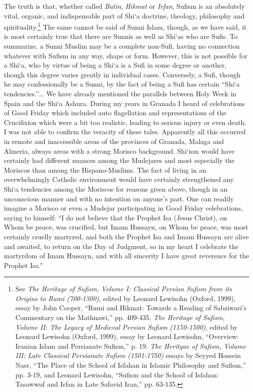 The truth is that, whether called \emph{Batin}, \emph{Hikmat} or \emph{Irfan}, Sufism is an absolutely vital, organic, and indispensable part of Shi`a doctrine, theology, philosophy and spirituality.\footnote{See \emph{The Heritage of Sufism, Volume I: Classical Persian Sufism from its Origins to Rumi (700-1300)}, edited by Leonard Lewisohn (Oxford, 1999), essay by John Cooper, ``Rumi and Hikmat: Towards a Reading of Sabziwari's Commentary on the Mathnawi,'' pp. 409-435. \emph{The Heritage of Sufism, Volume II: The Legacy of Medieval Persian Sufism (1150-1500)}, edited by Leonard Lewisohn (Oxford, 1999), essay by Leonard Lewisohn, ``Overview: Iranian Islam and Persianate Sufism,'' p. 19. \emph{The Heritgae of Sufism, Volume III: Late Classical Persianate Sufism (1501-1750)} essays by Seyyed Hossein Nasr, ``The Place of the School of Isfahan in Islamic Philosophy and Sufism,'' pp. 3-19, and Leonard Lewisohn, ``Sufism and the School of Isfahan: Tasawwuf and Irfan in Late Safavid Iran,'' pp. 63-135.} The same cannot be said of Sunni Islam, though, as we have said, it is most certainly true that there are Sunnis as well as Shi`as who are Sufis. To summarize, a Sunni Muslim may be a complete non-Sufi, having no connection whatever with Sufism in any way, shape or form. However, this is not possible for a Shi`a, who by virtue of being a Shi`a is a Sufi in some degree or another, though this degree varies greatly in individual cases. Conversely, a Sufi, though he may confessionally be a Sunni, by the fact of being a Sufi has certain ``Shi`a tendencies.''... We have already mentioned the parallels between Holy Week in Spain and the Shi`a Ashura. During my years in Granada I heard of celebrations of Good Friday which included auto flagellation and representations of the Crucifixion which were a bit too realistic, leading to serious injury or even death. I was not able to confirm the veracity of these tales. Apparently all this occurred in remote and inaccessible areas of the provinces of Granada, Malaga and Almeria, always areas with a strong Morisco background. Shi`ism would have certainly had different nuances among the Mudejares and most especially the Moriscos than among the Hispano-Muslims. The fact of living in an overwhelmingly Catholic environment would have certainly strengthened any Shi`a tendencies among the Moriscos for reasons given above, though in an unconscious manner and with no intention on anyone's part. One can readily imagine a Morisco or even a Mudejar participating in Good Friday celebrations, saying to himself: ``I do not believe that the Prophet Isa (Jesus Christ), on Whom be peace, was crucified, but Imam Hussayn, on Whom be peace, was most certainly cruelly martyred, and both the Prophet Isa and Imam Hussayn are alive and awaited, to return on the Day of Judgment, so in my heart I celebrate the martyrdom of Imam Hussayn, and with all sincerity I have great reverence for the Prophet Isa.''

